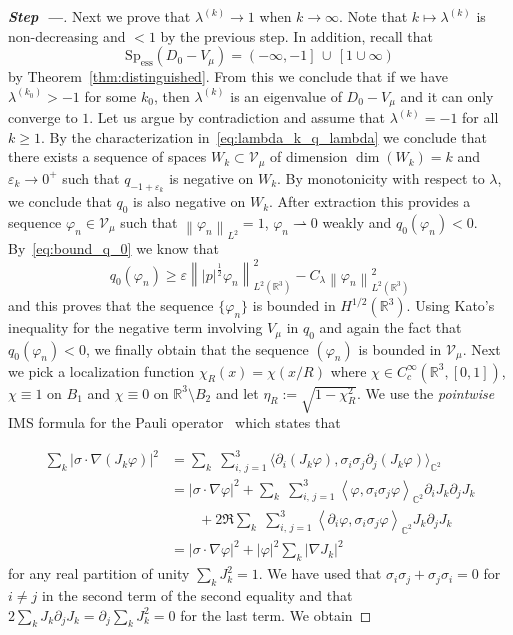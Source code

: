 \documentclass[10pt]{amsart}
\theoremstyle{definition}
\newcommand{\R}{\mathbb{R}}
\newcommand{\C}{\mathbb{C}}
\newcommand{\cV}{\mathcal{V}}
\newcommand{\Spec}{\mathrm{Sp}}
\DeclareMathOperator{\ess}{ess}
\newcommand\1{{\ensuremath {\mathds 1} }}
\renewcommand\phi{\varphi}
\newcommand{\wto}{\rightharpoonup}
\newcommand{\ii}{\infty}
\newcommand\pscal[1]{{\ensuremath{\left\langle #1 \right\rangle}}}
\newcommand{\norm}[1]{ \left\| #1 \right\|}
\renewcommand{\geq}{\geqslant}
\newcommand{\eps}{\varepsilon}
\newcounter{stepcount}
\newenvironment{step}[1]{\refstepcounter{stepcount}\begin{proof}[\bf{Step~\thestepcount\;---\;{#1}}]}{\let\qed\relax\end{proof}}
\begin{document}
\begin{step}{Proof of $\lambda^{(k)}\nearrow 1$.}
Next we prove that $\lambda^{(k)}\to1$ when $k\to\ii$. Note that $k\mapsto\lambda^{(k)}$ is non-decreasing and $<1$ by the previous step. In addition, recall that
\[
\Spec_{\ess}\left(D_0-V_\mu\right)=\left(-\ii,-1\right]\,\cup\,\left[1\cup\ii\right)
\]
by Theorem~\ref{thm:distinguished}. From this we conclude that if we have $\lambda^{(k_0)}>-1$ for some $k_0$, then $\lambda^{(k)}$ is an eigenvalue of $D_0-V_\mu$ and it can only converge to $1$. Let us argue by contradiction and assume that $\lambda^{(k)}=-1$ for all $k\geq1$. By the characterization in~\eqref{eq:lambda_k_q_lambda} we conclude that there exists a sequence of spaces $W_k\subset \cV_\mu$ of dimension $\dim(W_k)=k$ and $\eps_k\to0^+$ such that $q_{-1+\eps_k}$ is negative on $W_k$. By monotonicity with respect to $\lambda$, we conclude that $q_0$ is also negative on $W_k$. After extraction this provides a sequence $\phi_n\in\cV_\mu$ such that $\norm{\phi_n}_{L^2}=1$, $\phi_n\wto0$ weakly and $q_{0}(\phi_n)<0$. By~\eqref{eq:bound_q_0} we know that
\[
q_0(\phi_n)\geq \eps\norm{|p|^{\frac12}\phi_n}^2_{L^2\left(\R^3\right)}-C_\lambda\norm{\phi_n}_{L^2\left(\R^3\right)}^2
\]
and this proves that the sequence $\{\phi_n\}$ is bounded in $H^{1/2}(\R^3)$. Using Kato's inequality for the negative term involving $V_\mu$ in $q_0$ and again the fact that $q_0(\phi_n)<0$, we finally obtain that the sequence $(\phi_n)$ is bounded in $\cV_\mu$. Next we pick a localization function $\chi_R(x)=\chi(x/R)$ where $\chi\in C^\ii_c(\R^3,[0,1])$, $\chi\equiv1$ on $B_1$ and $\chi\equiv0$ on $\R^3\setminus B_2$ and let $\eta_R:=\sqrt{1-\chi_R^2}$. We use the \emph{pointwise} IMS formula for the Pauli operator~\cite{BosDolEst-08} which states that

\begin{equation}\label{eq:IMS}
\begin{aligned}
\sum_k\left|\sigma\cdot\nabla (J_k\phi)\right|^2&=\sum_k\;\sum_{i,\,j=1}^3\big\langle\partial_i(J_k\phi),\sigma_i\sigma_j \partial_j(J_k\phi)\big\rangle_{\C^2}\\
&=\left|\sigma\cdot \nabla\phi\right|^2+\sum_k\;\sum_{i,\,j=1}^3\pscal{\phi,\sigma_i\sigma_j \phi}_{\C^2}\partial_iJ_k\partial_j J_k\\
&\qquad+2\Re\sum_k\;\sum_{i,\,j=1}^3\pscal{\partial_i\phi,\sigma_i\sigma_j \phi}_{\C^2}J_k\partial_j J_k\\
&=\left|\sigma\cdot \nabla\phi\right|^2+|\phi|^2\sum_k \left|\nabla J_k\right|^2
\end{aligned}
\end{equation}
for any real partition of unity $\sum_k J_k^2=1$. We have used that $\sigma_i\sigma_j+\sigma_j\sigma_i=0$ for $i\neq j$ in the second term of the second equality and that $2\sum_k J_k\partial_j J_k=\partial_j\sum_k J_k^2=0$ for the last term. We obtain


\end{step}
\end{document}
